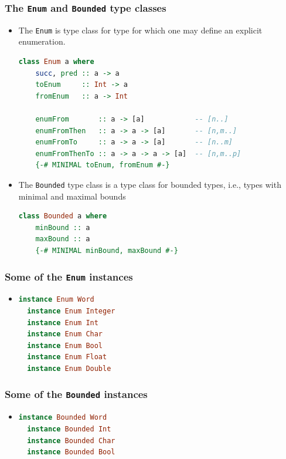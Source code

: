 \documentclass[10pt,pdf,utf8,russian,aspectratio=169]{beamer}
\begin{document}
\begin{frame}[fragile]
  \frametitle{The \verb"Enum" and \verb"Bounded" type classes}

\begin{itemize}
  \item The \verb"Enum" is type class for type for which one may define an explicit enumeration.
\begin{lstlisting}[language=Haskell]
  class Enum a where
    succ, pred :: a -> a
    toEnum     :: Int -> a
    fromEnum   :: a -> Int

    enumFrom       :: a -> [a]            -- [n..]
    enumFromThen   :: a -> a -> [a]       -- [n,m..]
    enumFromTo     :: a -> a -> [a]       -- [n..m]
    enumFromThenTo :: a -> a -> a -> [a]  -- [n,m..p]
    {-# MINIMAL toEnum, fromEnum #-}
  \end{lstlisting}

\item The \verb"Bounded" type class is a type class for bounded types, i.e., types with minimal and maximal bounds
\begin{lstlisting}[language=Haskell]
  class Bounded a where
    minBound :: a
    maxBound :: a
    {-# MINIMAL minBound, maxBound #-}
  \end{lstlisting}
\end{itemize}
\end{frame}

\begin{frame}[fragile]
  \frametitle{Some of the \verb"Enum" instances}

\begin{itemize}
  \item
\begin{lstlisting}[language=Haskell]
  instance Enum Word
  instance Enum Integer
  instance Enum Int
  instance Enum Char
  instance Enum Bool
  instance Enum Float
  instance Enum Double
\end{lstlisting}
\end{itemize}
\end{frame}

\begin{frame}[fragile]
  \frametitle{Some of the \verb"Bounded" instances}
\begin{itemize}
  \item
\begin{lstlisting}[language=Haskell]
  instance Bounded Word
  instance Bounded Int
  instance Bounded Char
  instance Bounded Bool
\end{lstlisting}
\end{itemize}
\end{frame}
\end{document}
